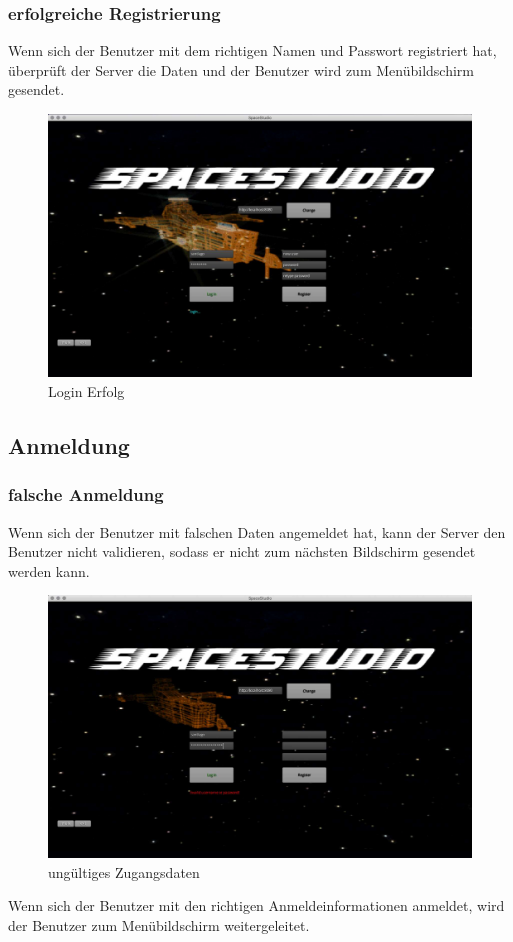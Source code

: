 \documentclass[12pt]{article}
\begin{document}
\subsubsection{erfolgreiche  Registrierung}
Wenn sich der Benutzer mit dem richtigen Namen und Passwort registriert hat, überprüft der Server die Daten und der Benutzer wird zum Menübildschirm gesendet.\\

\begin{figure}[h]
\centering
\includegraphics[scale=0.4]{TestProtocolBilder/erfolgLogin.jpg}
\caption{Login Erfolg}
\end{figure}
\newpage
\subsection{Anmeldung}
\subsubsection{ falsche Anmeldung}
Wenn sich der Benutzer mit falschen Daten angemeldet hat, kann der Server den Benutzer nicht validieren, sodass er nicht zum nächsten Bildschirm gesendet werden kann.
\begin{figure}[h]
\centering
\includegraphics[scale=0.4]{TestProtocolBilder/invalidCredentials.jpg}
\caption{ungültiges Zugangsdaten}
\end{figure}
\newpage
Wenn sich der Benutzer mit den richtigen Anmeldeinformationen anmeldet, wird der Benutzer zum Menübildschirm weitergeleitet.\\
\end{document}
